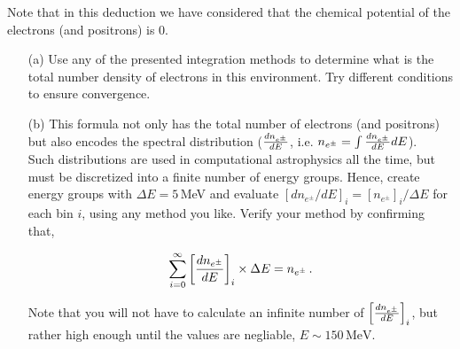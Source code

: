 \documentclass[11pt]{article}
\begin{document}
\begin{enumerate}
 Note that in this deduction we have considered that the chemical potential of the
electrons (and  positrons) is 0.

\begin{enumerate}
\item[(a)] Use any of the presented integration methods to determine what
  is the total number density of electrons in this environment. Try different conditions to ensure convergence. 

\item[(b)] This formula not only has the total number of
  electrons (and positrons) but also encodes the spectral distribution
  (${dn_{e^\pm} \over dE}$, i.e. $n_{e^\pm} = \int {dn_{e^\pm}\over
    dE} dE$).\\
  Such distributions are used in computational
  astrophysics all the time, but must be discretized into a finite
  number of energy groups. Hence, create energy groups with $\Delta E =
  5\,$MeV and evaluate $[dn_{e^\pm}/dE]_i = [n_{e^\pm}]_i / \Delta E$
  for each bin $i$, using any method you like. Verify your
  method by confirming that,

\begin{equation}
\sum_{i=0}^{\infty}\left[{dn_{e^\pm}\over
    dE}\right]_i \times \Delta E = n_{e^\pm}\,.
\end{equation}

Note that you will not have to calculate an infinite number of $\left[{dn_{e^\pm}\over
    dE}\right]_i$, but rather high enough until
the values are negliable, $E \sim 150\,\mathrm{MeV}$. \newline


\end{enumerate}
\end{enumerate}
\end{document}
